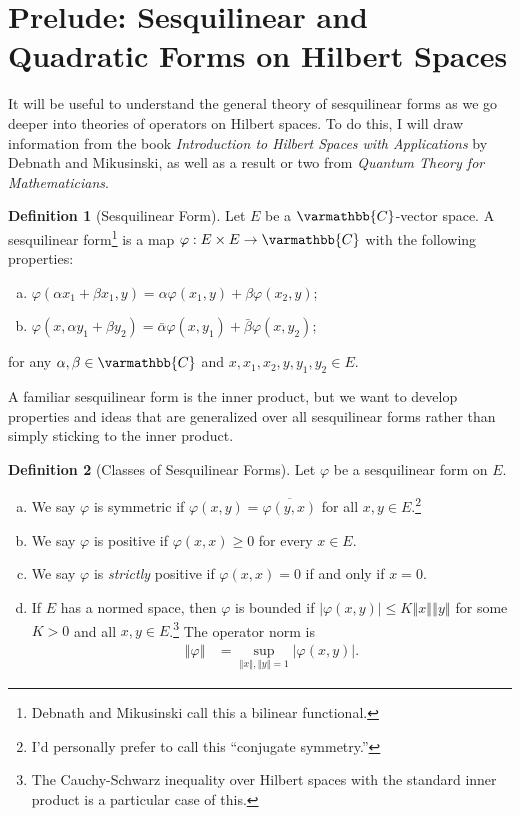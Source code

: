 \documentclass[12pt]{extarticle}
\newcommand{\C}{\varmathbb{C}}
\newcommand{\norm}[1]{\left\Vert #1\right\Vert}
\theoremstyle{plain}
\theoremstyle{definition}
\newtheorem*{definition}{Definition}
\theoremstyle{remark}
\begin{document}
  \section{Prelude: Sesquilinear and Quadratic Forms on Hilbert Spaces}%
  It will be useful to understand the general theory of sesquilinear forms as we go deeper into theories of operators on Hilbert spaces. To do this, I will draw information from the book \textit{Introduction to Hilbert Spaces with Applications} by Debnath and Mikusinski, as well as a result or two from \textit{Quantum Theory for Mathematicians}.

  \begin{definition}[Sesquilinear Form]
    Let $E$ be a $\C$-vector space. A sesquilinear form\footnote{Debnath and Mikusinski call this a bilinear functional.} is a map $\varphi: E\times E \rightarrow \C$ with the following properties:
    \begin{enumerate}[(a)]
      \item $\displaystyle \varphi(\alpha x_1 + \beta x_1,y) = \alpha \varphi(x_1,y) + \beta\varphi(x_2,y)$;
      \item $\displaystyle \varphi(x,\alpha y_1 + \beta y_2) = \bar{\alpha}\varphi(x,y_1) + \bar{\beta}\varphi(x,y_2)$;
    \end{enumerate}
    for any $\alpha,\beta \in \C$ and $x,x_1,x_2,y,y_1,y_2 \in E$.
  \end{definition}
  A familiar sesquilinear form is the inner product, but we want to develop properties and ideas that are generalized over all sesquilinear forms rather than simply sticking to the inner product.
  \begin{definition}[Classes of Sesquilinear Forms]
    Let $\varphi$ be a sesquilinear form on $E$.
    \begin{enumerate}[(a)]
      \item We say $\varphi$ is symmetric if $\varphi(x,y) = \overline{\varphi(y,x)}$ for all $x,y\in E$.\footnote{I'd personally prefer to call this ``conjugate symmetry.''}
      \item We say $\varphi$ is positive if $\varphi(x,x) \geq 0$ for every $x\in E$.
      \item We say $\varphi$ is \textit{strictly} positive if $\varphi(x,x) = 0 $ if and only if $x = 0$.
      \item If $E$ has a normed space, then $\varphi$ is bounded if $|\varphi(x,y)| \leq K\norm{x}\norm{y}$ for some $K > 0$ and all $x,y\in E$.\footnote{The Cauchy-Schwarz inequality over Hilbert spaces with the standard inner product is a particular case of this.} The operator norm is
        \begin{align*}
          \norm{\varphi} &= \sup_{\norm{x},\norm{y} = 1}\left\vert \varphi(x,y) \right\vert.
        \end{align*}
    \end{enumerate}
  \end{definition}
\end{document}
